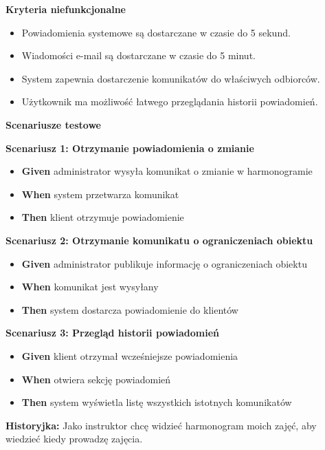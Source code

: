\documentclass[a4paper,12pt]{article}
\begin{document}
\noindent \textbf{Kryteria niefunkcjonalne}
\begin{itemize}
    \item Powiadomienia systemowe są dostarczane w czasie do 5 sekund.
    \item Wiadomości e-mail są dostarczane w czasie do 5 minut.
    \item System zapewnia dostarczenie komunikatów do właściwych odbiorców.
    \item Użytkownik ma możliwość łatwego przeglądania historii powiadomień.
\end{itemize}

\noindent \textbf{Scenariusze testowe}

\textbf{Scenariusz 1: Otrzymanie powiadomienia o zmianie}
\begin{itemize}
    \item \textbf{Given} administrator wysyła komunikat o zmianie w harmonogramie
    \item \textbf{When} system przetwarza komunikat
    \item \textbf{Then} klient otrzymuje powiadomienie
\end{itemize}

\textbf{Scenariusz 2: Otrzymanie komunikatu o ograniczeniach obiektu}
\begin{itemize}
    \item \textbf{Given} administrator publikuje informację o ograniczeniach obiektu
    \item \textbf{When} komunikat jest wysyłany
    \item \textbf{Then} system dostarcza powiadomienie do klientów
\end{itemize}

\textbf{Scenariusz 3: Przegląd historii powiadomień}
\begin{itemize}
    \item \textbf{Given} klient otrzymał wcześniejsze powiadomienia
    \item \textbf{When} otwiera sekcję powiadomień
    \item \textbf{Then} system wyświetla listę wszystkich istotnych komunikatów
\end{itemize}

\vspace{0,5cm}

\noindent \textbf{Historyjka:} Jako instruktor chcę widzieć harmonogram moich zajęć, aby wiedzieć kiedy prowadzę zajęcia.

\vspace{0,2cm}
\end{document}
